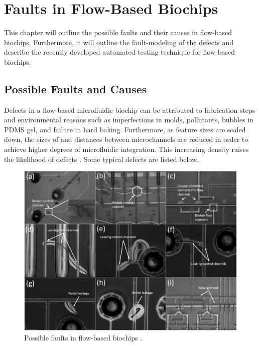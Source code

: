 \chapter{Faults in Flow-Based Biochips}
\label{chap:faults}
This chapter will outline the possible faults and their causes in flow-based biochips. Furthermore, it will outline the fault-modeling of the defects and describe the recently developed automated testing technique for flow-based biochips.

\section{Possible Faults and Causes}
Defects in a flow-based microfluidic biochip can be attributed to fabrication steps and environmental reasons such as imperfections in molds, pollutants, bubbles in PDMS gel, and failure in hard baking. Furthermore, as feature sizes are scaled down, the sizes of and distances between microchannels are reduced in order to achieve higher degrees of microfluidic integration. This increasing density raises the likelihood of defects \cite{fault-modeling}. Some typical defects are listed below.

\begin{figure}
\centering
\includegraphics[scale=0.45]{figures/possible-faults.png}
\caption[Possible faults in flow-based biochips]{Possible faults in flow-based biochips \cite{fault-modeling}.}
\label{fig:possible-faults}
\end{figure}


